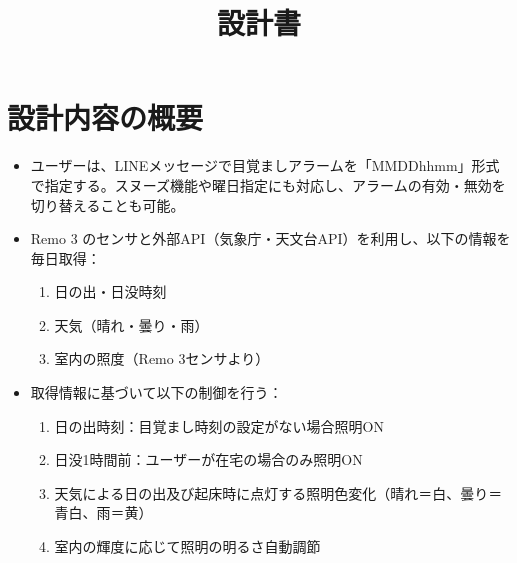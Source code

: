 \documentclass{jarticle}
\title{設計書}
\begin{document}
\maketitle

\section*{設計内容の概要}
\begin{itemize}
    \item ユーザーは、LINEメッセージで目覚ましアラームを「MMDDhhmm」形式で指定する。スヌーズ機能や曜日指定にも対応し、アラームの有効・無効を切り替えることも可能。\\
    \item Remo 3 のセンサと外部API（気象庁・天文台API）を利用し、以下の情報を毎日取得：\\
        \begin{enumerate}
            \item 日の出・日没時刻\\
            \item 天気（晴れ・曇り・雨）\\
            \item 室内の照度（Remo 3センサより）\\
        \end{enumerate}
    \item 取得情報に基づいて以下の制御を行う：\\
        \begin{enumerate}
            \item 日の出時刻：目覚まし時刻の設定がない場合照明ON\\
            \item 日没1時間前：ユーザーが在宅の場合のみ照明ON\\
            \item 天気による日の出及び起床時に点灯する照明色変化（晴れ＝白、曇り＝青白、雨＝黄）\\
            \item 室内の輝度に応じて照明の明るさ自動調節\\
        \end{enumerate}
\end{itemize}
\end{document}
